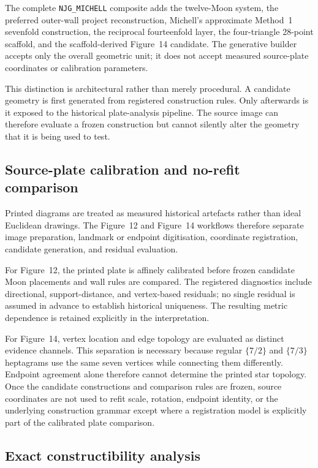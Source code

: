 \documentclass[11pt]{article}
\newcommand{\NJG}{\texttt{NJG\_MICHELL}}
\begin{document}
The complete \NJG{} composite adds the twelve-Moon system, the preferred
outer-wall project reconstruction, Michell's approximate Method~1 sevenfold
construction, the reciprocal fourteenfold layer, the four-triangle 28-point
scaffold, and the scaffold-derived Figure~14 candidate.  The generative
builder accepts only the overall geometric unit; it does not accept measured
source-plate coordinates or calibration parameters.

This distinction is architectural rather than merely procedural.  A candidate
geometry is first generated from registered construction rules.  Only
afterwards is it exposed to the historical plate-analysis pipeline.  The
source image can therefore evaluate a frozen construction but cannot silently
alter the geometry that it is being used to test.

\subsection{Source-plate calibration and no-refit comparison}

Printed diagrams are treated as measured historical artefacts rather than
ideal Euclidean drawings.  The Figure~12 and Figure~14 workflows therefore
separate image preparation, landmark or endpoint digitisation, coordinate
registration, candidate generation, and residual evaluation.

For Figure~12, the printed plate is affinely calibrated before frozen
candidate Moon placements and wall rules are compared.  The registered
diagnostics include directional, support-distance, and vertex-based residuals;
no single residual is assumed in advance to establish historical uniqueness.
The resulting metric dependence is retained explicitly in the interpretation.

For Figure~14, vertex location and edge topology are evaluated as distinct
evidence channels.  This separation is necessary because regular
$\{7/2\}$ and $\{7/3\}$ heptagrams use the same seven vertices while connecting
them differently.  Endpoint agreement alone therefore cannot determine the
printed star topology.  Once the candidate constructions and comparison
rules are frozen, source coordinates are not used to refit scale, rotation,
endpoint identity, or the underlying construction grammar except where a
registration model is explicitly part of the calibrated plate comparison.

\subsection{Exact constructibility analysis}
\end{document}
